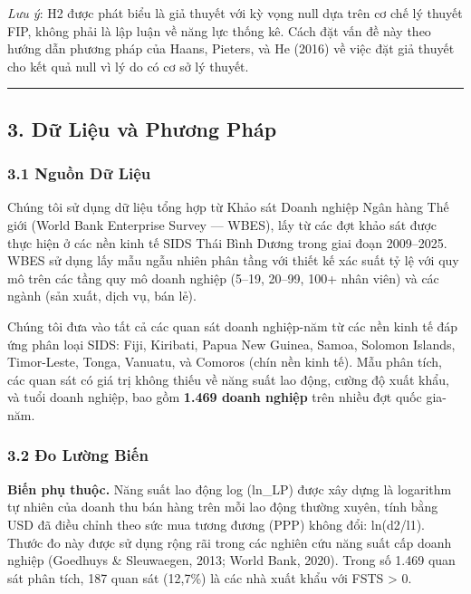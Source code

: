 \documentclass[12pt,a4paper]{article}
\begin{document}
\emph{Lưu ý}: H2 được phát biểu là giả thuyết với kỳ vọng null dựa trên
cơ chế lý thuyết FIP, không phải là lập luận về năng lực thống kê. Cách
đặt vấn đề này theo hướng dẫn phương pháp của Haans, Pieters, và He
(2016) về việc đặt giả thuyết cho kết quả null vì lý do có cơ sở lý
thuyết.

\begin{center}\rule{0.5\linewidth}{0.5pt}\end{center}

\hypertarget{3-dux1eef-liux1ec7u-vuxe0-phux1b0ux1a1ng-phuxe1p}{%
\subsection{3. Dữ Liệu và Phương
Pháp}\label{3-dux1eef-liux1ec7u-vuxe0-phux1b0ux1a1ng-phuxe1p}}

\hypertarget{31-nguux1ed3n-dux1eef-liux1ec7u}{%
\subsubsection{3.1 Nguồn Dữ
Liệu}\label{31-nguux1ed3n-dux1eef-liux1ec7u}}

Chúng tôi sử dụng dữ liệu tổng hợp từ Khảo sát Doanh nghiệp Ngân hàng
Thế giới (World Bank Enterprise Survey --- WBES), lấy từ các đợt khảo
sát được thực hiện ở các nền kinh tế SIDS Thái Bình Dương trong giai
đoạn 2009--2025. WBES sử dụng lấy mẫu ngẫu nhiên phân tầng với thiết kế
xác suất tỷ lệ với quy mô trên các tầng quy mô doanh nghiệp (5--19,
20--99, 100+ nhân viên) và các ngành (sản xuất, dịch vụ, bán lẻ).

Chúng tôi đưa vào tất cả các quan sát doanh nghiệp-năm từ các nền kinh
tế đáp ứng phân loại SIDS: Fiji, Kiribati, Papua New Guinea, Samoa,
Solomon Islands, Timor-Leste, Tonga, Vanuatu, và Comoros (chín nền kinh
tế). Mẫu phân tích, các quan sát có giá trị không thiếu về năng suất lao
động, cường độ xuất khẩu, và tuổi doanh nghiệp, bao gồm \textbf{1.469
doanh nghiệp} trên nhiều đợt quốc gia-năm.

\hypertarget{32-ux111o-lux1b0ux1eddng-biux1ebfn}{%
\subsubsection{3.2 Đo Lường
Biến}\label{32-ux111o-lux1b0ux1eddng-biux1ebfn}}

\textbf{Biến phụ thuộc.} Năng suất lao động log (ln\_LP) được xây dựng
là logarithm tự nhiên của doanh thu bán hàng trên mỗi lao động thường
xuyên, tính bằng USD đã điều chỉnh theo sức mua tương đương (PPP) không
đổi: ln(d2/l1). Thước đo này được sử dụng rộng rãi trong các nghiên cứu
năng suất cấp doanh nghiệp (Goedhuys \& Sleuwaegen, 2013; World Bank,
2020). Trong số 1.469 quan sát phân tích, 187 quan sát (12,7\%) là các
nhà xuất khẩu với FSTS \textgreater{} 0.
\end{document}
